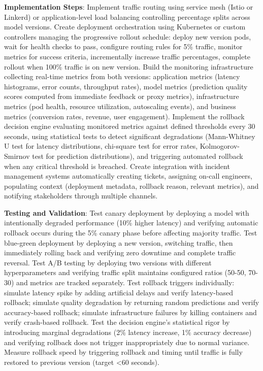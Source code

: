\textbf{Implementation Steps}: Implement traffic routing using service mesh (Istio or Linkerd) or application-level load balancing controlling percentage splits across model versions. Create deployment orchestration using Kubernetes or custom controllers managing the progressive rollout schedule: deploy new version pods, wait for health checks to pass, configure routing rules for 5\% traffic, monitor metrics for success criteria, incrementally increase traffic percentages, complete rollout when 100\% traffic is on new version. Build the monitoring infrastructure collecting real-time metrics from both versions: application metrics (latency histograms, error counts, throughput rates), model metrics (prediction quality scores computed from immediate feedback or proxy metrics), infrastructure metrics (pod health, resource utilization, autoscaling events), and business metrics (conversion rates, revenue, user engagement). Implement the rollback decision engine evaluating monitored metrics against defined thresholds every 30 seconds, using statistical tests to detect significant degradations (Mann-Whitney U test for latency distributions, chi-square test for error rates, Kolmogorov-Smirnov test for prediction distributions), and triggering automated rollback when any critical threshold is breached. Create integration with incident management systems automatically creating tickets, assigning on-call engineers, populating context (deployment metadata, rollback reason, relevant metrics), and notifying stakeholders through multiple channels.

\textbf{Testing and Validation}: Test canary deployment by deploying a model with intentionally degraded performance (10\% higher latency) and verifying automatic rollback occurs during the 5\% canary phase before affecting majority traffic. Test blue-green deployment by deploying a new version, switching traffic, then immediately rolling back and verifying zero downtime and complete traffic reversal. Test A/B testing by deploying two versions with different hyperparameters and verifying traffic split maintains configured ratios (50-50, 70-30) and metrics are tracked separately. Test rollback triggers individually: simulate latency spike by adding artificial delays and verify latency-based rollback; simulate quality degradation by returning random predictions and verify accuracy-based rollback; simulate infrastructure failures by killing containers and verify crash-based rollback. Test the decision engine's statistical rigor by introducing marginal degradations (2\% latency increase, 1\% accuracy decrease) and verifying rollback does not trigger inappropriately due to normal variance. Measure rollback speed by triggering rollback and timing until traffic is fully restored to previous version (target <60 seconds).

